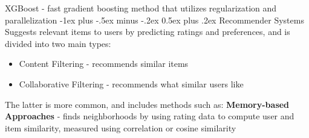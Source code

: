 \documentclass[10pt,landscape]{article}
\makeatletter
\renewcommand{\section}{\@startsection{section}{1}{0mm}%
                                {-1ex plus -.5ex minus -.2ex}%
                                {0.5ex plus .2ex}%
                                {\normalfont\large\bfseries}}
\makeatother
\begin{document}
\begin{multicols}{3}
XGBoost - fast gradient boosting method that utilizes regularization and parallelization
\section{Recommender Systems}
Suggests relevant items to users by predicting ratings and preferences, and is divided into two main types:
\begin{itemize}[label={--},leftmargin=4mm]
\itemsep -.4mm
\item Content Filtering - recommends similar items
\item Collaborative Filtering - recommends what similar users like
\end{itemize}

The latter is more common, and includes methods such as:
\textbf{Memory-based Approaches} - finds neighborhoods by using rating data to compute user and item similarity, measured using correlation or cosine similarity


\end{multicols}
\end{document}
